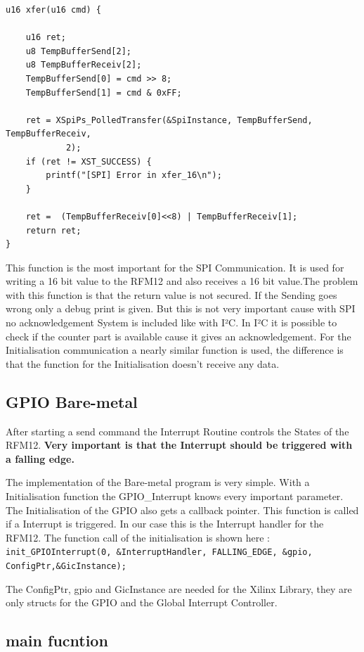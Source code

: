 \begin{lstlisting}
u16 xfer(u16 cmd) {

	u16 ret;
	u8 TempBufferSend[2];
	u8 TempBufferReceiv[2];
	TempBufferSend[0] = cmd >> 8;
	TempBufferSend[1] = cmd & 0xFF;

	ret = XSpiPs_PolledTransfer(&SpiInstance, TempBufferSend, TempBufferReceiv,
			2);
	if (ret != XST_SUCCESS) {
		printf("[SPI] Error in xfer_16\n");
	}

	ret =  (TempBufferReceiv[0]<<8) | TempBufferReceiv[1];
	return ret;
}
\end{lstlisting}

This function is the most important for the SPI Communication. It is used for writing a 16 bit value to the RFM12 and also receives a 16 bit value.The problem with this function is that the return value is not secured. If the Sending goes wrong only a debug print is given. But this is not very important cause with SPI no acknowledgement System is included like with I²C. In I²C it is possible to check if the counter part is available cause it gives an acknowledgement. For the Initialisation communication a nearly similar function is used, the difference is that the function for the Initialisation doesn't receive any data. \newline

\subsection{GPIO Bare-metal}

After starting a send command the Interrupt Routine controls the States of the RFM12.
\textbf{Very important is that the Interrupt should be triggered with a falling edge.} \newline

The implementation of the Bare-metal program is very simple. With a Initialisation function the GPIO\_Interrupt knows every important parameter. The Initialisation of the GPIO also gets a callback pointer. This function is called if a Interrupt is triggered. In our case this is the Interrupt handler for the RFM12. 
The function call of the initialisation is shown here : \verb|	init_GPIOInterrupt(0, &InterruptHandler, FALLING_EDGE, &gpio, ConfigPtr,&GicInstance);|

The ConfigPtr, gpio and GicInstance are needed for the Xilinx Library, they are only structs for the GPIO and the Global Interrupt Controller. 

\subsection{main fucntion}

